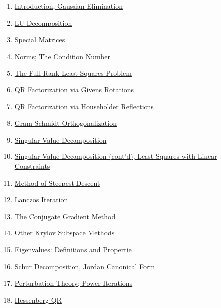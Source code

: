 \documentclass[11pt]{article}
\begin{document}
\begin{enumerate}
	\item \href{https://mp.weixin.qq.com/s/ur9Osnlf_GPXQKC-BlByvg}{Introduction, Gaussian Elimination}	%
	\item \href{https://mp.weixin.qq.com/s/RhVRGCpuNFnkfE3h_6qs7Q}{LU Decomposition}	%
	\item \href{https://mp.weixin.qq.com/s/Z5GQR-N9si24iM0uhV7Bew}{Special Matrices}	%
	\item \href{https://mp.weixin.qq.com/s/33nr--thQgX-pZ86tycMzw}{Norms; The Condition Number}	%
	\item \href{https://mp.weixin.qq.com/s/VphFhfg8LkflUL47pAQv2g}{The Full Rank Least Squares Problem}	%
	\item \href{https://mp.weixin.qq.com/s/Tm8kkDOsSTQ-t8kW6ksSag}{QR Factorization via Givens Rotations}	%
	\item \href{https://mp.weixin.qq.com/s/MadmSrU0rvBr3bqyfsY4eA}{QR Factorization via Householder Reflections}	%
	\item \href{https://mp.weixin.qq.com/s/WWVwxNGjWY6Ww_SNY0XA9Q}{Gram-Schmidt Orthogonalization}	%
	\item \href{https://mp.weixin.qq.com/s/xZJeEWLzppmHQR0RQVOHfQ}{Singular Value Decomposition}	%
	\item \href{https://mp.weixin.qq.com/s/_afvnoD2PyFQFBQEBPaIVw}{Singular Value Decomposition (cont'd), Least Squares with Linear Constraints}	%
	\item \href{https://mp.weixin.qq.com/s/K-65n_jMp0_coTZQS_7MtA}{Method of Steepest Descent}	%
	\item \href{https://mp.weixin.qq.com/s/31IyRqIrUTtZMbdGerPNOg}{Lanczos Iteration}	%
	\item \href{https://mp.weixin.qq.com/s/_f8G8dYKrknWdtX8bECrEg}{The Conjugate Gradient Method}	%
	\item \href{https://mp.weixin.qq.com/s/fCr_YnGEJ4OMnF47KJ5XKQ}{Other Krylov Subspace Methods}	%
	\item \href{https://mp.weixin.qq.com/s/q3jvWljhnMySkN2inhhhyA}{Eigenvalues: Definitions and Propertie}	%
	\item \href{https://mp.weixin.qq.com/s/fYMOg_aV-ja7UyMsNR0cgQ}{Schur Decomposition, Jordan Canonical Form}	%
	\item \href{https://mp.weixin.qq.com/s/N3c9ycUXvnqRGR3_FVz0oA}{Perturbation Theory; Power Iterations}	%
	\item \href{https://mp.weixin.qq.com/s/wMntlJivea04nhKwW6-IRQ}{Hessenberg QR}	%

\end{enumerate}
\end{document}
